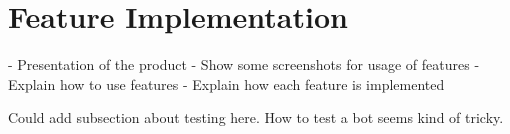 \section{Feature Implementation}

-	Presentation of the product
-	Show some screenshots for usage of features
-	Explain how to use features
-	Explain how each feature is implemented


Could add subsection about testing here.
How to test a bot seems kind of tricky.
